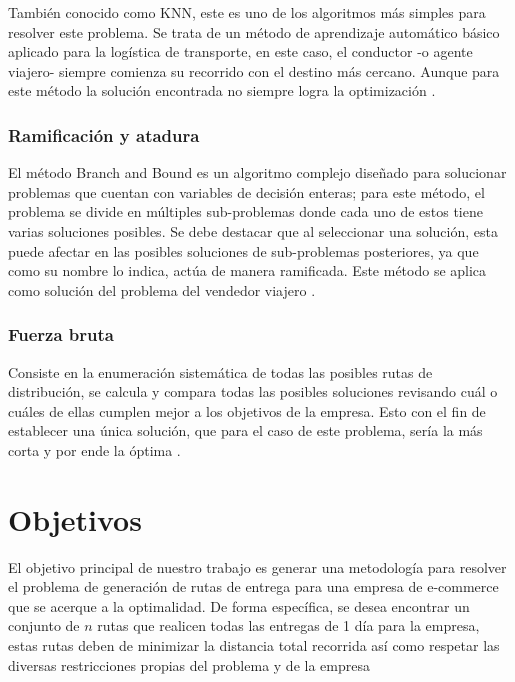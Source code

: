\documentclass[journal]{IEEEtran}
\begin{document}
            También conocido como KNN, este es uno de los algoritmos más simples para resolver este problema. Se trata de un método de aprendizaje automático básico aplicado para la logística de transporte, en este caso, el conductor -o agente viajero- siempre comienza su recorrido con el destino más cercano. Aunque para este método la solución encontrada no siempre logra la optimización \cite{trevelingProb}.

        \subsubsection{Ramificación y atadura}
        
            El método Branch and Bound es un algoritmo complejo diseñado para solucionar problemas que cuentan con variables de decisión enteras; para este método, el problema se divide en múltiples sub-problemas donde cada uno de estos tiene varias soluciones posibles. Se debe destacar que al seleccionar una solución, esta puede afectar en las posibles soluciones de sub-problemas posteriores, ya que como su nombre lo indica, actúa de manera ramificada. Este método se aplica como solución del problema del vendedor viajero \cite{trevelingProb}.

        \subsubsection{Fuerza bruta}
        
            Consiste en la enumeración sistemática de todas las posibles rutas de distribución, se calcula y compara todas las posibles soluciones revisando cuál o cuáles de ellas cumplen mejor a los objetivos de la empresa. Esto con el fin de establecer una única solución, que para el caso de este problema, sería la más corta y por ende la óptima \cite{trevelingProb}.
    
    \section{Objetivos} \label{sec:objectives}

        El objetivo principal de nuestro trabajo es generar una metodología para resolver el problema de generación de rutas de entrega para una empresa de e-commerce que se acerque a la optimalidad. De forma específica, se desea encontrar un conjunto de $n$ rutas que realicen todas las entregas de 1 día para la empresa, estas rutas deben de minimizar la distancia total recorrida así como respetar las diversas restricciones propias del problema y de la empresa
\end{document}
